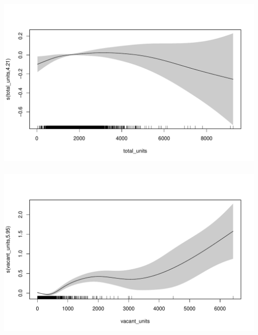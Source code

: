 \documentclass[xetex,mathserif,serif,aspectratio=169]{beamer}
\begin{document}
\begin{frame}[fragile] \frametitle{} \oldB \small

\begin{center}
\includegraphics[width=\textwidth]{img/gamRug04.pdf}
\end{center}

\end{frame}

\begin{frame}[fragile] \frametitle{} \oldB \small

\begin{center}
\includegraphics[width=\textwidth]{img/gamRug05.pdf}
\end{center}

\end{frame}
\end{document}

